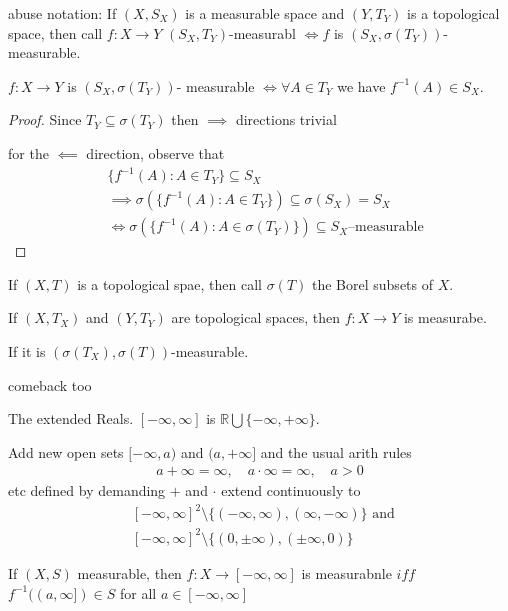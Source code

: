 abuse notation:
If $(X, S_X)$ is a measurable space and  $(Y, T_Y)$ is a topological space, then call $f : X \to Y$
$(S_X, T_Y)$-measurabl $\iff f$ is $(S_X, \sigma(T_Y))$- measurable.

\begin{theorem}
	$f : X \to Y$ is $(S_X, \sigma(T_Y))$- measurable $\iff \forall A \in T_Y$ we have $f^{-1}(A) \in S_X$.
\end{theorem}

\begin{proof}
	Since $T_Y \subseteq \sigma(T_Y)$ 
	then $\implies$ directions trivial 

	for the $\impliedby$ direction, observe that 
	\begin{align*}
		&\{f^{-1}(A) : A \in T_Y\} \subseteq S_X \\
		&\implies \sigma(\{f^{-1}(A) : A \in T_Y\}) \subseteq \sigma(S_X) = S_X \\
		&\iff \sigma(\{f^{-1}(A) : A \in \sigma(T_Y)\}) \subseteq  S_X \text{--measurable}
	\end{align*}
\end{proof}

If $(X,T)$ is a topological spae, then call $\sigma(T)$ the Borel subsets of  $X.$ 

If $(X, T_X)$ and $(Y,T_Y)$ are topological spaces, then $f:X \to Y$ is measurabe.

If it is  $(\sigma(T_X), \sigma(T))$-measurable.

comeback too

\begin{definition}
	The extended Reals.
	$[-\infty,\infty]$ is $\mathbb{R} \bigcup \{-\infty, +\infty\}$.

	Add new open sets $[-\infty, a)$ and $(a, +\infty]$ 
	and the usual arith rules
	\begin{align*}
		a + \infty = \infty, \quad a\cdot \infty = \infty, \quad a > 0
	\end{align*} etc defined by demanding $+$ and $\cdot$ extend continuously to
	\begin{align*}
		&[-\infty, \infty]^2 \setminus \{(-\infty, \infty), (\infty, -\infty)\} \text{ and } \\
		&[-\infty, \infty]^2 \setminus \{(0, \pm \infty), (\pm \infty, 0)\}
	\end{align*}
\end{definition}

\begin{corollary}
	If $(X,S)$ measurable, then $f : X \to [-\infty, \infty]$ is measurabnle 
	$iff$ $f^{-1}((a,\infty]) \in S$ for all $a \in [-\infty,\infty]$
\end{corollary}

